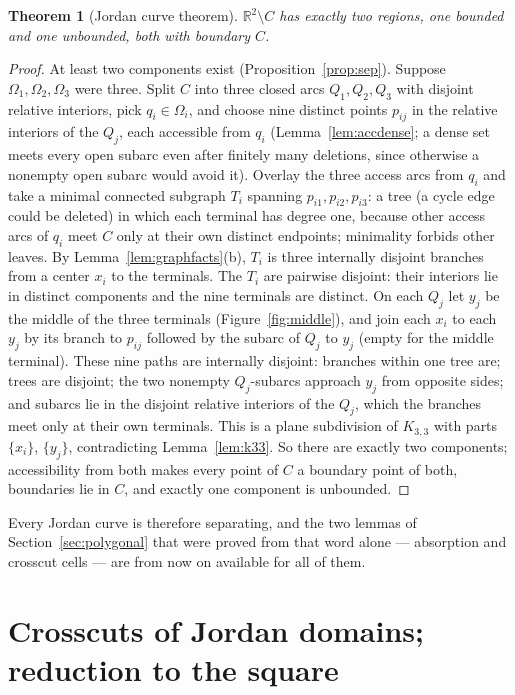 \documentclass[11pt,a4paper]{article}
\theoremstyle{jsplain}
\newtheorem{theorem}{Theorem}[section]
\theoremstyle{jsdefn}
\begin{document}
\begin{theorem}[Jordan curve theorem]\label{thm:jct}
$\mathbb R^2\setminus C$ has exactly two regions, one bounded and one
unbounded, both with boundary $C$.
\end{theorem}
\begin{proof}
At least two components exist (Proposition~\ref{prop:sep}). Suppose
$\Omega_1,\Omega_2,\Omega_3$ were three. Split $C$ into three closed
arcs $Q_1,Q_2,Q_3$ with disjoint relative interiors, pick
$q_i\in\Omega_i$, and choose nine distinct points $p_{ij}$ in the
relative interiors of the $Q_j$, each accessible from $q_i$
(Lemma~\ref{lem:accdense}; a dense set meets every open subarc even
after finitely many deletions, since otherwise a nonempty open subarc
would avoid it). Overlay the three access arcs from $q_i$ and take a
minimal connected subgraph $T_i$ spanning $p_{i1},p_{i2},p_{i3}$: a
tree (a cycle edge could be deleted) in which each terminal has degree
one, because other access arcs of $q_i$ meet $C$ only at their own
distinct endpoints; minimality forbids other leaves. By
Lemma~\ref{lem:graphfacts}(b), $T_i$ is three internally disjoint
branches from a center $x_i$ to the terminals. The $T_i$ are pairwise
disjoint: their interiors lie in distinct components and the nine
terminals are distinct. On each $Q_j$ let $y_j$ be the middle of the
three terminals (Figure~\ref{fig:middle}), and join each $x_i$ to each $y_j$ by its branch to
$p_{ij}$ followed by the subarc of $Q_j$ to $y_j$ (empty for the
middle terminal). These nine paths are internally disjoint: branches
within one tree are; trees are disjoint; the two nonempty $Q_j$-subarcs
approach $y_j$ from opposite sides; and subarcs lie in the disjoint
relative interiors of the $Q_j$, which the branches meet only at their
own terminals. This is a plane subdivision of $K_{3,3}$ with parts
$\{x_i\}$, $\{y_j\}$, contradicting Lemma~\ref{lem:k33}. So there are
exactly two components; accessibility from both makes every point of
$C$ a boundary point of both, boundaries lie in $C$, and exactly one
component is unbounded.
\end{proof}

Every Jordan curve is therefore separating, and the two lemmas of
Section~\ref{sec:polygonal} that were proved from that word alone ---
absorption and crosscut cells --- are from now on available for all of
them.

\section{Crosscuts of Jordan domains; reduction to the square}\label{sec:reduce}
\end{document}
